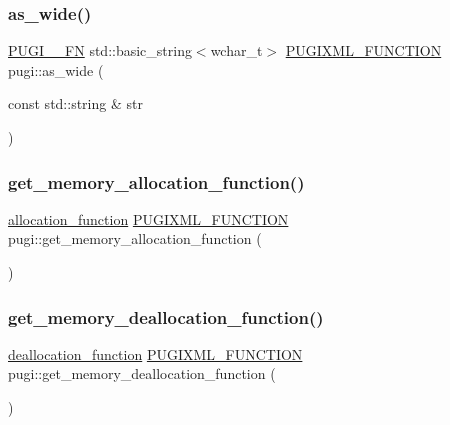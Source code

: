 \mbox{\label{namespacepugi_af33046c0db1ff7b3f63327d32fc6dca7}} 
\subsubsection{\texorpdfstring{as\+\_\+wide()}{as\_wide()}\hspace{0.1cm}{\footnotesize\ttfamily [3/3]}}
{\footnotesize\ttfamily \hyperlink{pugixml_8cpp_a82c335af3ca48cdb209c506bf8dd6ad2}{P\+U\+G\+I\+\_\+\+\_\+\+FN} std\+::basic\+\_\+string$<$wchar\+\_\+t$>$ \hyperlink{pugixml_8hpp_a3d91f8ab11645e6dac8783d86d152b31}{P\+U\+G\+I\+X\+M\+L\+\_\+\+F\+U\+N\+C\+T\+I\+ON} pugi\+::as\+\_\+wide (\begin{DoxyParamCaption}\item[{const std\+::string \&}]{str }\end{DoxyParamCaption})}

\mbox{\label{namespacepugi_a0d3d42320b07fe1865feb5e8e7c01e38}} 
\subsubsection{\texorpdfstring{get\+\_\+memory\+\_\+allocation\+\_\+function()}{get\_memory\_allocation\_function()}}
{\footnotesize\ttfamily \hyperlink{namespacepugi_a7b2d97e5b6040fe323d342268b6ffd4b}{allocation\+\_\+function} \hyperlink{pugixml_8hpp_a3d91f8ab11645e6dac8783d86d152b31}{P\+U\+G\+I\+X\+M\+L\+\_\+\+F\+U\+N\+C\+T\+I\+ON} pugi\+::get\+\_\+memory\+\_\+allocation\+\_\+function (\begin{DoxyParamCaption}{ }\end{DoxyParamCaption})}

\mbox{\label{namespacepugi_a0823c1cb767482d9d72d1df055be3b67}} 
\subsubsection{\texorpdfstring{get\+\_\+memory\+\_\+deallocation\+\_\+function()}{get\_memory\_deallocation\_function()}}
{\footnotesize\ttfamily \hyperlink{namespacepugi_a3587161b9f8d7ac4ac2d6a45b82462be}{deallocation\+\_\+function} \hyperlink{pugixml_8hpp_a3d91f8ab11645e6dac8783d86d152b31}{P\+U\+G\+I\+X\+M\+L\+\_\+\+F\+U\+N\+C\+T\+I\+ON} pugi\+::get\+\_\+memory\+\_\+deallocation\+\_\+function (\begin{DoxyParamCaption}{ }\end{DoxyParamCaption})}

